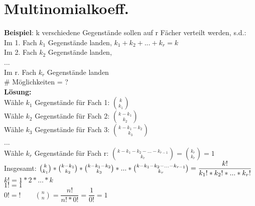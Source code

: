 \section{Multinomialkoeff.}
 	\textbf{Beispiel}: k verschiedene Gegenstände sollen auf r Fächer verteilt werden, s.d.:\\
 	Im 1. Fach $k_1$ Gegenstände landen, \hspace{1cm} $k_1 +k_2+ ... + k_r = k$\\
 	Im 2. Fach $k_2$ Gegenstände landen,\\...\\
 	Im r. Fach $k_r$ Gegenstände landen\smallskip\\\# Möglichkeiten = ?\medskip\\
 	\textbf{Lösung:}\\
 	 Wähle $k_1$ Gegenstände für Fach 1: $\binom{k}{k_1}$\smallskip\\
 	Wähle $k_2$ Gegenstände für Fach 2: $\binom{k-k_1}{k_2}$\smallskip\\
 	Wähle $k_3$ Gegenstände für Fach 3: $\binom{k-k_1-k_2}{k_3}$\\
 	...\\
 	Wähle $k_r$ Gegenstände für Fach r: $\binom{k-k_1-k_2-...-k_{r-1}}{k_r} = \binom{k_r}{k_r} = 1$\medskip\\
 	Insgesamt: $\binom{k}{k_1}*\binom{k-k_1}{k_2}*\binom{k-k_1-k_2}{k_3}*...*\binom{k-k_1-k_2-...-k_{r-1}}{k_r} = \\\dfrac{k!}{k_1!*k_2!*...*k_r!}$\medskip\\
 	$k! = 1 * 2 * ... * k$\\
 	$1! = 1$\\
 	$0! = ! \qquad \binom{n}{n} = \dfrac{n!}{n!*0!}=\dfrac{1}{0!}=1$
